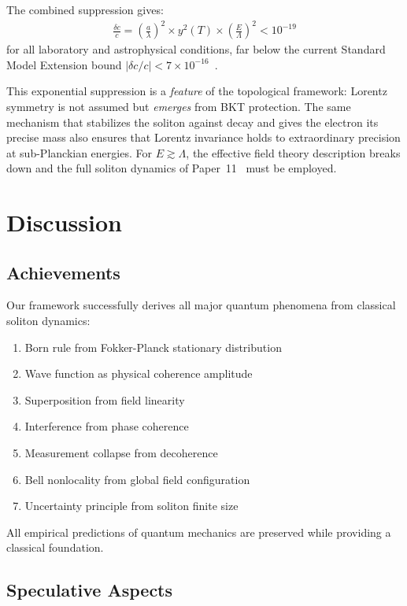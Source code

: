 ﻿\documentclass[twocolumn,showpacs,preprintnumbers,amsmath,amssymb,prd]{revtex4-2}
\begin{document}
The combined suppression gives:
\begin{align}
\frac{\delta c}{c} = \left(\frac{a}{\lambda}\right)^2 \times y^2(T) \times \left(\frac{E}{\Lambda}\right)^2 < 10^{-19}
\end{align}
for all laboratory and astrophysical conditions,
far below the current Standard Model Extension bound
$|\delta c/c| < 7 \times 10^{-16}$~\cite{Kostelecky2025}.

This exponential suppression is a \emph{feature} of the topological
framework: Lorentz symmetry is not assumed but \emph{emerges}
from BKT protection. The same mechanism that stabilizes the soliton
against decay and gives the electron its precise mass also ensures
that Lorentz invariance holds to extraordinary precision at
sub-Planckian energies. For $E \gtrsim \Lambda$, the effective
field theory description breaks down and the full soliton dynamics
of Paper~11~\cite{Paper11} must be employed.

\section{Discussion}

\subsection{Achievements}

Our framework successfully derives all major quantum phenomena from classical soliton dynamics:
\begin{enumerate}
\item Born rule from Fokker-Planck stationary distribution
\item Wave function as physical coherence amplitude
\item Superposition from field linearity
\item Interference from phase coherence
\item Measurement collapse from decoherence
\item Bell nonlocality from global field configuration
\item Uncertainty principle from soliton finite size
\end{enumerate}

All empirical predictions of quantum mechanics are preserved while providing a classical foundation.

\subsection{Speculative Aspects}
\end{document}
